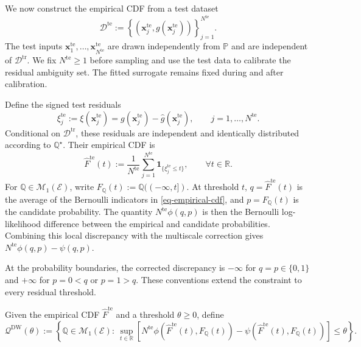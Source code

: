 \documentclass[review,11pt,3p,authoryear,nopreprintline]{elsarticle}
\begin{document}
We now construct the empirical CDF from a test dataset
\[
  \mathcal D^{\mathrm{te}}:=\left\{\left(\bm x_j^{\mathrm{te}},g(\bm x_j^{\mathrm{te}})\right)\right\}_{j=1}^{N^{\mathrm{te}}}.
\]
The test inputs $\bm x_1^{\mathrm{te}},\ldots,\bm x_{N^{\mathrm{te}}}^{\mathrm{te}}$ are drawn independently from $\mathbb P$ and are independent of $\mathcal D^{\mathrm{tr}}$. We fix $N^{\mathrm{te}}\ge1$ before sampling and use the test data to calibrate the residual ambiguity set. The fitted surrogate remains fixed during and after calibration.

Define the signed test residuals
\[
  \xi_j^{\mathrm{te}}:=\xi(\bm x_j^{\mathrm{te}})=g(\bm x_j^{\mathrm{te}})-\hat g(\bm x_j^{\mathrm{te}}),\qquad j=1,\ldots,N^{\mathrm{te}}.
\]
Conditional on $\mathcal D^{\mathrm{tr}}$, these residuals are independent and identically distributed according to $\mathbb Q^\star$. Their empirical CDF is
\begin{equation}
  \widehat F^{\mathrm{te}}(t):=\frac{1}{N^{\mathrm{te}}}\sum_{j=1}^{N^{\mathrm{te}}}\mathbf 1_{\{\xi_j^{\mathrm{te}}\le t\}},\qquad \forall t\in\mathbb R.
  \label{eq-empirical-cdf}
\end{equation}
For $\mathbb Q\in\mathcal M_1(\mathcal E)$, write $F_{\mathbb Q}(t):=\mathbb Q(({-\infty},t])$. At threshold $t$, $q=\widehat F^{\mathrm{te}}(t)$ is the average of the Bernoulli indicators in \eqref{eq-empirical-cdf}, and $p=F_{\mathbb Q}(t)$ is the candidate probability. The quantity $N^{\mathrm{te}}\phi(q,p)$ is then the Bernoulli log-likelihood difference between the empirical and candidate probabilities. Combining this local discrepancy with the multiscale correction gives $N^{\mathrm{te}}\phi(q,p)-\psi(q,p)$.

At the probability boundaries, the corrected discrepancy is $-\infty$ for $q=p\in\{0,1\}$ and $+\infty$ for $p=0<q$ or $p=1>q$. These conventions extend the constraint to every residual threshold.

\begin{definition}
  \label{definition-dw-ambiguity-set}
  Given the empirical CDF $\widehat F^{\mathrm{te}}$ and a threshold $\theta\ge0$, define
  \begin{equation} 
    \label{eq-cdf-ambiguity-set}
      \mathcal Q^{\mathrm{DW}}(\theta):=\left\{\mathbb Q\in\mathcal M_1(\mathcal E):\ 
      \sup_{t\in\mathbb R}\left[ N^{\mathrm{te}}\phi\!\left(\widehat F^{\mathrm{te}}(t),F_{\mathbb Q}(t)\right) 
       {}-\psi\!\left(\widehat F^{\mathrm{te}}(t),F_{\mathbb Q}(t)\right)\right]\le\theta\right\}. 
  \end{equation} 
\end{definition}
\end{document}
